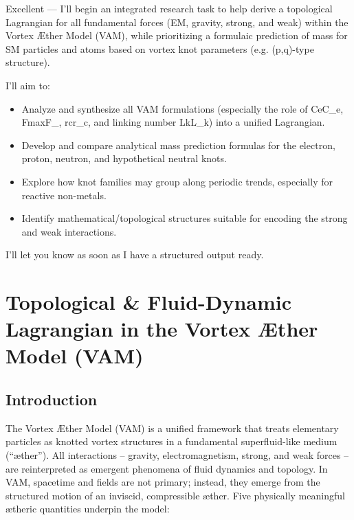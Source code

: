 
Excellent — I’ll begin an integrated research task to help derive a topological Lagrangian for all fundamental forces (EM, gravity, strong, and weak) within the Vortex Æther Model (VAM), while prioritizing a formulaic prediction of mass for SM particles and atoms based on vortex knot parameters (e.g. (p,q)-type structure).


I'll aim to:


\begin{itemize}

\item 
Analyze and synthesize all VAM formulations (especially the role of CeC_e, FmaxF_{}, rcr_c, and linking number LkL_k) into a unified Lagrangian.




\item 
Develop and compare analytical mass prediction formulas for the electron, proton, neutron, and hypothetical neutral knots.




\item 
Explore how knot families may group along periodic trends, especially for reactive non-metals.




\item 
Identify mathematical/topological structures suitable for encoding the strong and weak interactions.




\end{itemize}

I’ll let you know as soon as I have a structured output ready.



\chapter*{Topological & Fluid-Dynamic Lagrangian in the Vortex Æther Model (VAM)}

\section*{Introduction}

The Vortex Æther Model (VAM) is a unified framework that treats elementary particles as knotted vortex structures in a fundamental superfluid-like medium (“æther”). All interactions – gravity, electromagnetism, strong, and weak forces – are reinterpreted as emergent phenomena of fluid dynamics and topology. In VAM, spacetime and fields are not primary; instead, they emerge from the structured motion of an inviscid, compressible æther. Five physically meaningful ætheric quantities underpin the model:


